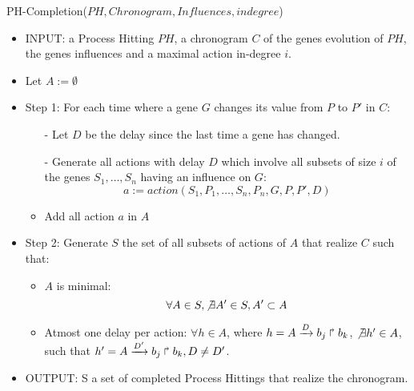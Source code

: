 \begin{algorithm}
	\caption{PH-Completion($PH,Chronogram,Influences,indegree$)}
	\label{alg:PHC_ap}
	\begin{itemize}
		\item INPUT: a Process Hitting $PH$, a chronogram $C$ of the genes evolution of $PH$, the genes influences and a maximal action in-degree $i$.

		\item Let $A := \emptyset$
		\item Step 1: For each time where a gene $G$ changes its value from $P$ to $P'$ in $C$:

		\begin{itemize}
			\item[-] Let $D$ be the delay since the last time a gene has changed.
			\item[-] Generate all actions with delay $D$ which involve all subsets of size $i$ of the genes $S_1, \ldots, S_n$ having an influence on $G$:
			$$a := action(S_1,P_1,\ldots, S_n,P_n, G, P, P', D)$$
			\item Add all action $a$ in $A$
		\end{itemize}
		
		
		\item Step 2: Generate $S$ the set of all subsets of actions of $A$ that realize $C$ such that:
		\begin{itemize}
			\item $A$ is minimal: $$\forall A \in S, \not \exists A' \in S, A' \subset A$$
			\item Atmost one delay per action: $\forall h \in A$, where $h = A\xrightarrow{D} b_j \Rsh b_k$, $\not \exists h' \in A$, such that $h' = A\xrightarrow{D'} b_j \Rsh b_k, D \not = D'$.
		\end{itemize}
			
		\item OUTPUT: S a set of completed Process Hittings that realize the chronogram.
	\end{itemize}
\end{algorithm}

